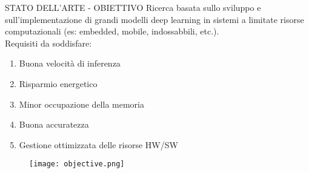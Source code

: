 \begin{frame}{STATO DELL'ARTE - OBIETTIVO}
    Ricerca basata sullo sviluppo e sull'implementazione di grandi modelli deep learning in sistemi a 
    limitate risorse computazionali (es: embedded, mobile, indossabbili, etc.).\\
    Requisiti da soddisfare:\\
    \hspace{1cm}
    \begin{minipage}{\linewidth}
        \centering
        \begin{minipage}{0.45\linewidth}
            \begin{enumerate}
                \item Buona velocità di inferenza
                \item Risparmio energetico
                \item Minor occupazione della memoria
                \item Buona accuratezza
                \item Gestione ottimizzata delle risorse HW/SW
            \end{enumerate}
        \end{minipage}
        \begin{minipage}{0.45\linewidth}
            \begin{figure}
                \centering
                \texttt{[image: objective.png]}
                \centering
            \end{figure}
        \end{minipage}
    \end{minipage}
\end{frame}